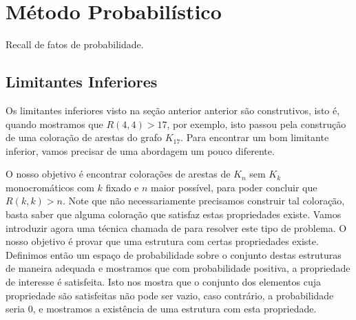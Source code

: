 
\chapter{Método Probabilístico}


Recall de fatos de probabilidade.


\section{Limitantes Inferiores}

Os limitantes inferiores visto na seção anterior anterior são construtivos, isto é, quando mostramos que $R(4,4) > 17$, por exemplo, isto passou pela construção de uma coloração de arestas do grafo $K_{17}$. Para encontrar um bom limitante inferior, vamos precisar de uma abordagem um pouco diferente.

O nosso objetivo é encontrar colorações de arestas de $K_n$ sem $K_k$ monocromáticos com $k$ fixado e $n$ maior possível, para poder concluir que $R(k,k) > n$. Note que não necessariamente precisamos construir tal coloração, basta saber que alguma coloração que satisfaz estas propriedades existe. Vamos introduzir agora uma técnica chamada de  para resolver este tipo de problema. O nosso objetivo é provar que uma estrutura com certas propriedades existe. Definimos então um espaço de probabilidade sobre o conjunto destas estruturas de maneira adequada e mostramos que com probabilidade positiva, a propriedade de interesse é satisfeita. Isto nos mostra que o conjunto dos elementos cuja propriedade são satisfeitas não pode ser vazio, caso contrário, a probabilidade seria 0, e mostramos a existência de uma estrutura com esta propriedade.

